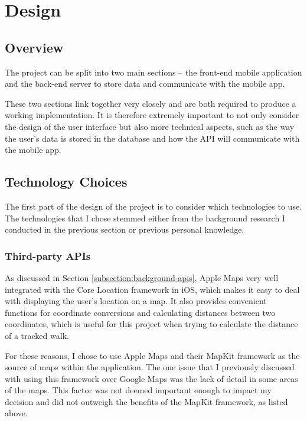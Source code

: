 \chapter{Design}

\section{Overview}

The project can be split into two main sections -- the front-end mobile application and the back-end server to store data and communicate with the mobile app.

These two sections link together very closely and are both required to produce a working implementation. It is therefore extremely important to not only consider the design of the user interface but also more technical aspects, such as the way the user's data is stored in the database and how the API will communicate with the mobile app.

\section{Technology Choices}

The first part of the design of the project is to consider which technologies to use. The technologies that I chose stemmed either from the background research I conducted in the previous section or previous personal knowledge.



\subsection{Third-party APIs}

As discussed in Section \ref{subsection:background-apis}, Apple Maps very well integrated with the Core Location framework in iOS, which makes it easy to deal with displaying the user's location on a map. It also provides convenient functions for coordinate conversions and calculating distances between two coordinates, which is useful for this project when trying to calculate the distance of a tracked walk.

For these reasons, I chose to use Apple Maps and their MapKit framework as the source of maps within the application. The one issue that I previously discussed with using this framework over Google Maps was the lack of detail in some areas of the maps. This factor was not deemed important enough to impact my decision and did not outweigh the benefits of the MapKit framework, as listed above.

